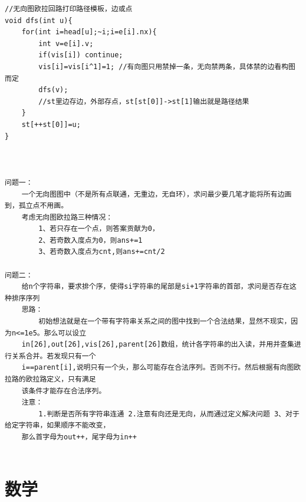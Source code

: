 \documentclass[twoside]{article}
\begin{document}
\begin{lstlisting}
//无向图欧拉回路打印路径模板，边或点
void dfs(int u){
    for(int i=head[u];~i;i=e[i].nx){
        int v=e[i].v;
        if(vis[i]) continue;
        vis[i]=vis[i^1]=1; //有向图只用禁掉一条，无向禁两条，具体禁的边看构图而定
        dfs(v);
        //st里边存边，外部存点，st[st[0]]->st[1]输出就是路径结果
    }
    st[++st[0]]=u;
}



问题一：
	一个无向图图中（不是所有点联通，无重边，无自环），求问最少要几笔才能将所有边画到，孤立点不用画。
	考虑无向图欧拉路三种情况：
		1、若只存在一个点，则答案贡献为0，
		2、若奇数入度点为0，则ans+=1
		3、若奇数入度点为cnt,则ans+=cnt/2

问题二：
    给n个字符串，要求排个序，使得si字符串的尾部是si+1字符串的首部，求问是否存在这种排序序列
    思路：
        初始想法就是在一个带有字符串关系之间的图中找到一个合法结果，显然不现实，因为n<=1e5。那么可以设立
    in[26],out[26],vis[26],parent[26]数组，统计各字符串的出入读，并用并查集进行关系合并。若发现只有一个
    i==parent[i],说明只有一个头，那么可能存在合法序列。否则不行。然后根据有向图欧拉路的欧拉路定义，只有满足
    该条件才能存在合法序列。
    注意：
        1.判断是否所有字符串连通 2.注意有向还是无向，从而通过定义解决问题 3、对于给定字符串，如果顺序不能改变，
    那么首字母为out++，尾字母为in++
    
\end{lstlisting}
\clearpage\section{数学}
\end{document}

